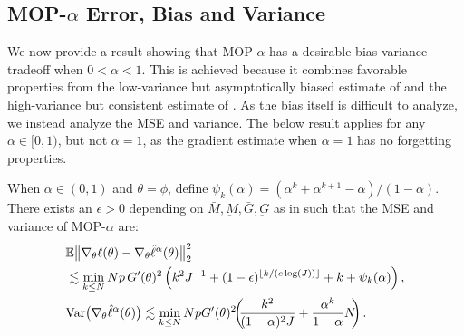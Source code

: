 \documentclass[9pt,twocolumn,pnasresearcharticle]{pnas-new}
\newcommand\arxiv[2]{#2} %
\begin{document}
\arxiv{}{\vspace*{-2mm}}
\subsection{MOP-$\alpha$ Error, Bias and Variance}

We now provide a result showing that MOP-$\alpha$ has a desirable bias-variance tradeoff when $0<\alpha<1$.
This is achieved because it combines favorable properties from the low-variance but asymptotically biased estimate of \cite{naesseth18} and the high-variance but consistent estimate of \cite{poyiadjis11}. 
As the bias itself is difficult to analyze, we instead analyze the MSE and variance. 
The below result applies for any $\alpha \in [0,1)$, but not $\alpha=1$, as the gradient estimate when $\alpha=1$ has no forgetting properties. 

\begin{thm}
    \label{thm:mop-biasvar}
    When $\alpha\in (0,1)$ and $\theta=\phi$, define $\psi_k(\alpha)=(\alpha^k  + \alpha^{k+1} - \alpha)/(1-\alpha)$. 
    There exists an $\epsilon>0$ depending on $\bar{M}, \underbar{M}, \bar{G}, \underbar{G}$ as in \cite{karjalainen23} such that the MSE and variance of MOP-$\alpha$ are:
    \vspace*{-1ex}
    \arxiv{\begin{eqnarray}
        \E\big\|\nabla_\theta\ell(\theta) - \nabla_\theta \hat\ell^\alpha(\theta)\big\|_2^2 
        &\lesssim& \min_{k \leq N} Np \, G'(\theta)^2\left(k^2J^{-1}+(1-\epsilon)^{\floor{k/(c\log(J))}}+k+\psi_k(\alpha)\right), \label{eq:mop-mse}
        \\
        \Var\big(\nabla_\theta \hat\ell^{\alpha}(\theta)\big) &\lesssim& \min_{k\leq N} Np \, G'(\theta)^2\left(\frac{k^2}{(1-\alpha)^2J} + \frac{\alpha^{k}}{1-\alpha}N\right). \label{eq:mop-variance}
        \end{eqnarray}}{\begin{align}
        &\mathbb{E}\big\|\nabla_\theta\ell(\theta) - \nabla_\theta \hat\ell^\alpha(\theta)\big\|_2^2 \label{eq:mop-mse}\\
        &\lesssim \min_{k \leq N} Np \, G'(\theta)^2\left(k^2J^{-1}+(1-\epsilon)^{\lfloor k/(c\log(J)) \rfloor}+k+\psi_k(\alpha)\right), \nonumber 
        \\
        &\mathrm{Var}\big(\nabla_\theta \hat\ell^{\alpha}(\theta)\big) \lesssim \min_{k\leq N} Np  G'(\theta)^2\hspace{-0.8ex}\left(\hspace{-0.8ex}\frac{k^2}{(1-\alpha)^2J} + \frac{\alpha^{k}}{1-\alpha}N\hspace{-0.8ex}\right). \label{eq:mop-variance}
        \end{align}}
\end{thm}
\arxiv{}{\vspace*{-1ex}}
\end{document}
